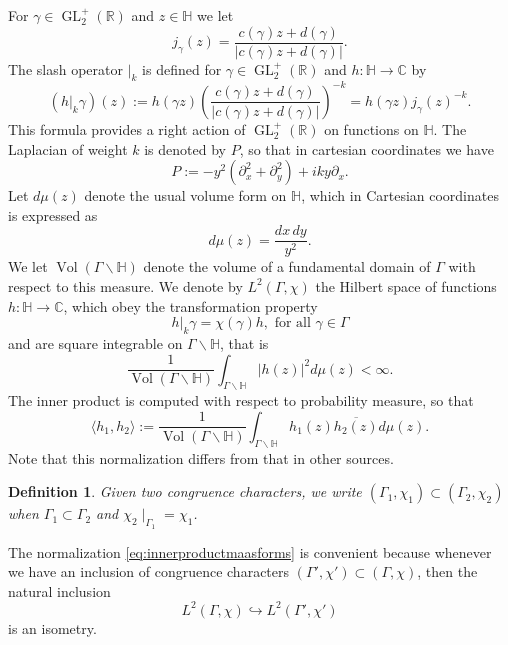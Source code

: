 \documentclass{article}
\newtheorem{defi}[thm]{Definition}
\theoremstyle{named}
\newcommand{\CC}{\mathbb{C}}
\newcommand{\Hyp}{\mathbb{H}}
\newcommand{\R}{\mathbb{R}}
\DeclareMathOperator{\GL}{GL}
\DeclareMathOperator{\vol}{Vol}
\begin{document}
For $\gamma \in \GL_2^+(\R)$ and $z \in \Hyp$ we let
\begin{equation}\label{eq:deficocyclej}
    j_\gamma(z) = \frac{c(\gamma)z + d(\gamma)}{|c(\gamma)z + d(\gamma)|}.
\end{equation}
The slash operator $|_k$ is defined for
 $\gamma \in \GL_2^+(\R)$ and $h: \Hyp \rightarrow \CC$ by
\begin{equation}\label{eq:slashoperator}
    (h|_k \gamma)(z) := h(\gamma z) \left(\frac{c(\gamma)z + d(\gamma)}{|c(\gamma)z + d(\gamma)|}\right)^{-k} = h(\gamma z)j_\gamma(z)^{-k}.
\end{equation}
This formula provides a right action of $\GL_2^+(\R)$ on functions on $\Hyp$. The Laplacian of weight $k$ is denoted by $P$, so that in cartesian coordinates we have
\begin{equation}\label{eq:laplacianoperatorweightk}
    P := -y^2(\partial_x^2 + \partial_y^2) + iky\partial_x.
\end{equation}
Let $d\mu(z)$ denote the usual volume form on $\Hyp$, which in Cartesian coordinates is expressed as
\begin{equation*}
        d\mu(z) = \frac{dx\, dy}{y^2}.
\end{equation*}
We let $\vol(\Gamma\backslash \Hyp)$ denote the volume of a fundamental domain of $\Gamma$ with respect to this measure. We denote by $L^2(\Gamma, \chi)$ the Hilbert space of functions $h: \Hyp \rightarrow \CC$, 
which obey the transformation property
\begin{equation*}
    h|_k \gamma = \chi(\gamma)h, \text{ for all }\gamma \in \Gamma 
\end{equation*}
and are square integrable on $\Gamma\backslash \Hyp$, that is
\begin{equation*}
    \frac{1}{\vol(\Gamma\backslash \Hyp)}\int_{\Gamma\backslash \Hyp}|h(z)|^2 d\mu(z)
< \infty.
\end{equation*}
The inner product is computed with respect to probability measure, so that
\begin{equation}\label{eq:innerproductmaasforms}
    \langle h_1,h_2 \rangle := \frac{1}{\vol(\Gamma\backslash \Hyp)}\int_{\Gamma \backslash \Hyp} h_1(z)\overline{h_2(z)} d\mu(z).
\end{equation}
Note that this normalization differs from that in other sources. 
\begin{defi}
Given two congruence characters, we write $(\Gamma_1, \chi_1)\subset (\Gamma_2, \chi_2)$ when $\Gamma_1 \subset \Gamma_2$ and $\chi_2 \mid_{\Gamma_1} = \chi_1$.
\end{defi}
The normalization \eqref{eq:innerproductmaasforms} is convenient because whenever we have an inclusion of congruence characters $(\Gamma', \chi')\subset (\Gamma, \chi)$, then the natural inclusion 
\begin{equation*}
    L^2(\Gamma, \chi) \hookrightarrow L^2(\Gamma', \chi')
\end{equation*}
is an isometry.
\end{document}
